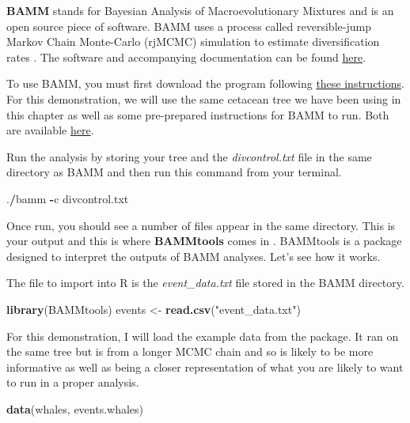 \documentclass[
]{book}
\newenvironment{Shaded}{\begin{snugshade}}{\end{snugshade}}
\newcommand{\KeywordTok}[1]{\textcolor[rgb]{0.13,0.29,0.53}{\textbf{#1}}}
\newcommand{\NormalTok}[1]{#1}
\newcommand{\OperatorTok}[1]{\textcolor[rgb]{0.81,0.36,0.00}{\textbf{#1}}}
\newcommand{\StringTok}[1]{\textcolor[rgb]{0.31,0.60,0.02}{#1}}
\begin{document}
\textbf{BAMM} stands for Bayesian Analysis of Macroevolutionary Mixtures and is an open source piece of software. BAMM uses a process called reversible-jump Markov Chain Monte-Carlo (rjMCMC) simulation to estimate diversification rates \citep{Rabosky14}. The software and accompanying documentation can be found \href{http://bamm-project.org/}{here}.

To use BAMM, you must first download the program following \href{http://bamm-project.org/download.html}{these instructions}. For this demonstration, we will use the same cetacean tree we have been using in this chapter as well as some pre-prepared instructions for BAMM to run. Both are available \href{http://lukejharmon.github.io/ilhabela/instruction/2015/07/02/diversification-analysis-bamm-rpanda/\#rpanda}{here}.

Run the analysis by storing your tree and the \emph{divcontrol.txt} file in the same directory as BAMM and then run this command from your terminal.

\begin{Shaded}
\begin{Highlighting}[]
\NormalTok{.}\OperatorTok{/}\NormalTok{bamm }\OperatorTok{{-}}\NormalTok{c divcontrol.txt}
\end{Highlighting}
\end{Shaded}

Once run, you should see a number of files appear in the same directory. This is your output and this is where \textbf{BAMMtools} comes in \citep{bammtools}. BAMMtools is a package designed to interpret the outputs of BAMM analyses. Let's see how it works.

The file to import into R is the \emph{event\_data.txt} file stored in the BAMM directory.

\begin{Shaded}
\begin{Highlighting}[]
\KeywordTok{library}\NormalTok{(BAMMtools)}
\NormalTok{events \textless{}{-}}\StringTok{ }\KeywordTok{read.csv}\NormalTok{(}\StringTok{"event\_data.txt"}\NormalTok{)}
\end{Highlighting}
\end{Shaded}

For this demonstration, I will load the example data from the package. It ran on the same tree but is from a longer MCMC chain and so is likely to be more informative as well as being a closer representation of what you are likely to want to run in a proper analysis.

\begin{Shaded}
\begin{Highlighting}[]
\KeywordTok{data}\NormalTok{(whales, events.whales)}
\end{Highlighting}
\end{Shaded}
\end{document}
